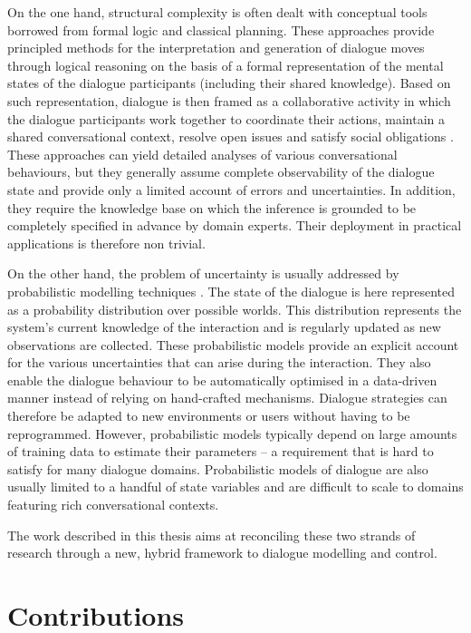 On the one hand, structural complexity is often dealt with conceptual tools borrowed from formal logic and classical planning.  These approaches provide principled methods for the interpretation and generation of dialogue moves through logical reasoning on the basis of a formal representation of the mental states of the dialogue participants (including their shared knowledge). Based on such representation, dialogue is then framed as a collaborative activity in which the dialogue participants work together to coordinate their actions, maintain a shared conversational context, resolve open issues and satisfy social obligations \citep{larsson2002,Jokinen:2009,Ginzburg2012}. These approaches can yield detailed analyses of various conversational behaviours, but they generally assume complete observability of the dialogue state and provide only a limited account of errors and uncertainties. In addition, they require the knowledge base on which the inference is grounded to be completely specified in advance by domain experts.  Their deployment in practical applications is therefore non trivial. 

On the other hand, the problem of uncertainty is usually addressed by probabilistic modelling techniques \citep{Roy:2000,FramptonL09,Young:2010}.  The state of the dialogue is here represented as a probability distribution over possible worlds.  This distribution represents the system's current knowledge of the interaction and is regularly updated as new observations are collected. These probabilistic models provide an explicit account for the various uncertainties that can arise during the interaction. They also enable the dialogue behaviour to be automatically optimised in a data-driven manner instead of relying on hand-crafted mechanisms.  Dialogue strategies can therefore be adapted to new environments or users without having to be reprogrammed. However, probabilistic models typically depend on large amounts of training data to estimate their parameters -- a requirement that is hard to satisfy for many dialogue domains.  Probabilistic models of dialogue are also usually limited to a handful of state variables and are difficult to scale to domains featuring rich conversational contexts. 

The work described in this thesis aims at reconciling these two strands of research through a new, hybrid framework to dialogue modelling and control. 

\section{Contributions}

